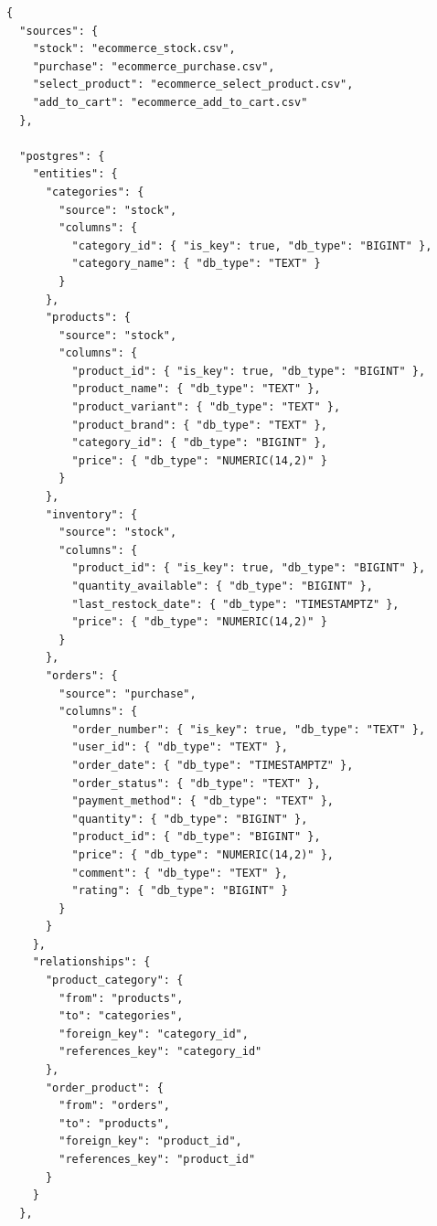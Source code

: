 \begin{lstlisting}[style=jsonstyle,caption={Arquivo de importação completo do cenário exemplo (\texttt{import\_config.json}).},label={lst:import-config-full}]
{
  "sources": {
    "stock": "ecommerce_stock.csv",
    "purchase": "ecommerce_purchase.csv",
    "select_product": "ecommerce_select_product.csv",
    "add_to_cart": "ecommerce_add_to_cart.csv"
  },

  "postgres": {
    "entities": {
      "categories": {
        "source": "stock",
        "columns": {
          "category_id": { "is_key": true, "db_type": "BIGINT" },
          "category_name": { "db_type": "TEXT" }
        }
      },
      "products": {
        "source": "stock",
        "columns": {
          "product_id": { "is_key": true, "db_type": "BIGINT" },
          "product_name": { "db_type": "TEXT" },
          "product_variant": { "db_type": "TEXT" },
          "product_brand": { "db_type": "TEXT" },
          "category_id": { "db_type": "BIGINT" },
          "price": { "db_type": "NUMERIC(14,2)" }
        }
      },
      "inventory": {
        "source": "stock",
        "columns": {
          "product_id": { "is_key": true, "db_type": "BIGINT" },
          "quantity_available": { "db_type": "BIGINT" },
          "last_restock_date": { "db_type": "TIMESTAMPTZ" },
          "price": { "db_type": "NUMERIC(14,2)" }
        }
      },
      "orders": {
        "source": "purchase",
        "columns": {
          "order_number": { "is_key": true, "db_type": "TEXT" },
          "user_id": { "db_type": "TEXT" },
          "order_date": { "db_type": "TIMESTAMPTZ" },
          "order_status": { "db_type": "TEXT" },
          "payment_method": { "db_type": "TEXT" },
          "quantity": { "db_type": "BIGINT" },
          "product_id": { "db_type": "BIGINT" },
          "price": { "db_type": "NUMERIC(14,2)" },
          "comment": { "db_type": "TEXT" },
          "rating": { "db_type": "BIGINT" }
        }
      }
    },
    "relationships": {
      "product_category": {
        "from": "products",
        "to": "categories",
        "foreign_key": "category_id",
        "references_key": "category_id"
      },
      "order_product": {
        "from": "orders",
        "to": "products",
        "foreign_key": "product_id",
        "references_key": "product_id"
      }
    }
  },


\end{lstlisting}
